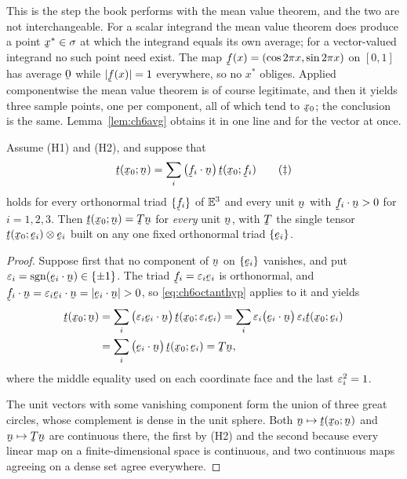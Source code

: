 This is the step the book performs with the mean value theorem, and the
two are not interchangeable. For a scalar integrand the mean value
theorem does produce a point $\bx^{*}\in\sigma$ at which the integrand
equals its own average; for a vector-valued integrand no such point need
exist. The map $\bff(x)=(\cos2\pi x,\sin2\pi x)$ on $[0,1]$ has average
$\bze$ while $|\bff(x)|=1$ everywhere, so no $x^{*}$ obliges. Applied
componentwise the mean value theorem is of course legitimate, and then
it yields three sample points, one per component, all of which tend to
$\bx_{0}$; the conclusion is the same. Lemma~\ref{lem:ch6avg} obtains it
in one line and for the vector at once.

\begin{lemma}\label{lem:ch6octant}
Assume \textup{(H1)} and \textup{(H2)}, and suppose that
\begin{equation}
   \bt(\bx_{0};\bn)=\sum_{i}\big(\ip{\bff_{i}}\bn\big)\,
   \bt(\bx_{0};\bff_{i})
   \tag{$\ddagger$}\label{eq:ch6octanthyp}
\end{equation}
holds for every orthonormal triad $\{\bff_{i}\}$ of $\mathbb{E}^{3}$ and every unit
$\bn$ with $\ip{\bff_{i}}\bn>0$ for $i=1,2,3$. Then
$\bt(\bx_{0};\bn)=\bT\bn$ for \emph{every} unit $\bn$, with $\bT$ the
single tensor $\bt(\bx_{0};\be_{i})\otimes\be_{i}$ built on any one
fixed orthonormal triad $\{\be_{i}\}$.
\end{lemma}

\begin{proof}
Suppose first that no component of $\bn$ on $\{\be_{i}\}$ vanishes, and
put $\eps_{i}=\operatorname{sgn}(\ip{\be_{i}}\bn)\in\{\pm1\}$. The
triad $\bff_{i}=\eps_{i}\be_{i}$ is orthonormal, and
$\ip{\bff_{i}}\bn=\eps_{i}\ip{\be_{i}}\bn=|\ip{\be_{i}}\bn|>0$, so
\eqref{eq:ch6octanthyp} applies to it and yields
\[
\begin{aligned}
   \bt(\bx_{0};\bn)
   &=\sum_{i}\big(\ip{\eps_{i}\be_{i}}\bn\big)\,
     \bt(\bx_{0};\eps_{i}\be_{i})
   =\sum_{i}\eps_{i}\big(\ip{\be_{i}}\bn\big)\,
     \eps_{i}\bt(\bx_{0};\be_{i})\\
   &=\sum_{i}\big(\ip{\be_{i}}\bn\big)\,\bt(\bx_{0};\be_{i})=\bT\bn ,
\end{aligned}
\]
where the middle equality used  on each coordinate face and
the last $\varepsilon^{2}_{i}=1$.

The unit vectors with some vanishing component form the union of three
great circles, whose complement is dense in the unit sphere. Both
$\bn\mapsto\bt(\bx_{0};\bn)$ and $\bn\mapsto\bT\bn$ are continuous
there, the first by \textup{(H2)} and the second because every linear
map on a finite-dimensional space is continuous, and two continuous maps
agreeing on a dense set agree everywhere.
\end{proof}

